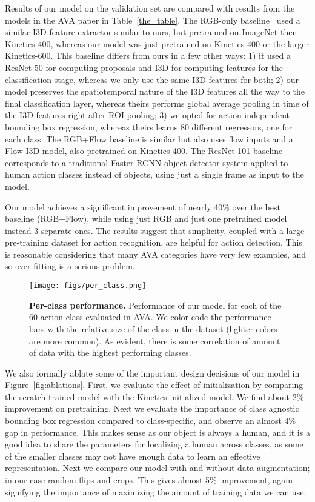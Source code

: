 \documentclass{article}
\begin{document}
  Results of our model on the validation set are compared with results from the models in the AVA paper in Table~\ref{the_table}. 
  The RGB-only baseline~\cite{gu2017ava} used a similar I3D feature extractor similar to ours, but pretrained on ImageNet then Kinetics-400, whereas our model was just pretrained on Kinetics-400 or the larger Kinetics-600. 
  This baseline differs from ours in a few other ways: 
  1) it used a ResNet-50 for computing proposals and I3D for computing features for the classification stage, whereas we only use the same I3D features for both; 
  2) our model preserves the spatiotemporal nature of the I3D features all the way to the final classification layer, whereas theirs performs global average pooling in time of the I3D features right after ROI-pooling; 
  3) we opted for action-independent bounding box regression, whereas theirs learns 80 different regressors, one for each class.
  The RGB+Flow baseline is similar but also uses flow inputs and a Flow-I3D model, also pretrained on Kinetics-400. 
  The ResNet-101 baseline corresponds to a traditional Faster-RCNN object detector system applied to human action classes instead of objects, using just a single frame as input to the model.


  Our model achieves a significant improvement of nearly 40\% over the best baseline (RGB+Flow), while using just RGB and just one pretrained model instead 3 separate ones. 
  The results suggest that simplicity, coupled with a large pre-training dataset for action recognition, are helpful for action detection.
  This is reasonable considering that many AVA categories have very few examples, and so over-fitting is a serious problem.



\begin{figure}[t]
    \centering
    \texttt{[image: figs/per\_class.png]}\hfill
    \caption{{\bf Per-class performance.} Performance of our model for each of the 60 action class evaluated in AVA. We color code the performance bars with the relative size of the class in the dataset (lighter colors are more common). As evident, there is some correlation of amount of data with the highest performing classes.}
    \label{fig:per-class}
\end{figure}
  
We also formally ablate some of the important design decisions of our model in Figure~\ref{fig:ablations}. First, we evaluate the effect of initialization by comparing the scratch trained model with the Kinetics initialized model. We find about 2\% improvement on pretraining. Next we evaluate the importance of class agnostic bounding box regression compared to class-specific, and observe an almost 4\% gap in performance. This makes sense as our object is always a human, and it is a good idea to share the parameters for localizing a human across classes, as some of the smaller classes may not have enough data to learn an effective representation. Next we compare our model with and without data augmentation; in our case random flips and crops. This gives almost 5\% improvement, again signifying the importance of maximizing the amount of training data we can use.
\end{document}
